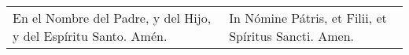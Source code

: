 \documentclass[./rosary.tex]{subfiles}
\begin{document}
\begin{center}
    \\
\end{center}

\begin{longtable} { p{} p{} }
    En el Nombre del Padre, y del Hijo, y del Espíritu Santo. Amén.
        &
    In Nómine Pátris, et Filii, et Spíritus Sancti. Amen.
\end{longtable}
\end{document}
